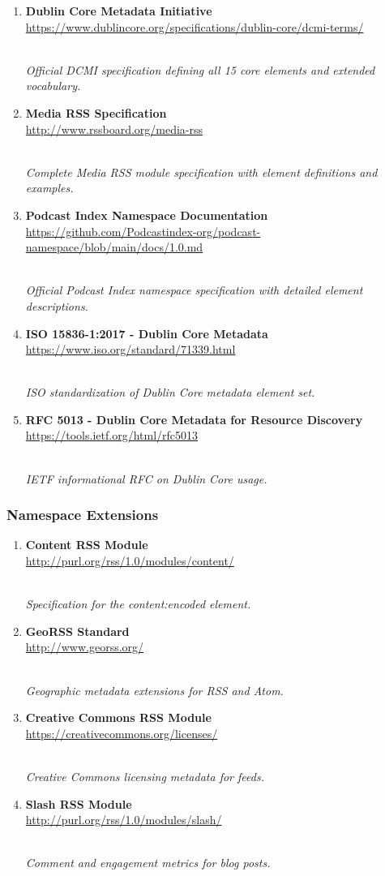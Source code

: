 \documentclass[
  letterpaper,
  DIV=11,
  numbers=noendperiod]{scrartcl}
\begin{document}
\begin{enumerate}
\def\labelenumi{\arabic{enumi}.}
\item
  \textbf{Dublin Core Metadata Initiative}\\
  \url{https://www.dublincore.org/specifications/dublin-core/dcmi-terms/}\strut \\
  \emph{Official DCMI specification defining all 15 core elements and
  extended vocabulary.}
\item
  \textbf{Media RSS Specification}\\
  \url{http://www.rssboard.org/media-rss}\strut \\
  \emph{Complete Media RSS module specification with element definitions
  and examples.}
\item
  \textbf{Podcast Index Namespace Documentation}\\
  \url{https://github.com/Podcastindex-org/podcast-namespace/blob/main/docs/1.0.md}\strut \\
  \emph{Official Podcast Index namespace specification with detailed
  element descriptions.}
\item
  \textbf{ISO 15836-1:2017 - Dublin Core Metadata}\\
  \url{https://www.iso.org/standard/71339.html}\strut \\
  \emph{ISO standardization of Dublin Core metadata element set.}
\item
  \textbf{RFC 5013 - Dublin Core Metadata for Resource Discovery}\\
  \url{https://tools.ietf.org/html/rfc5013}\strut \\
  \emph{IETF informational RFC on Dublin Core usage.}
\end{enumerate}

\subsubsection{Namespace Extensions}\label{namespace-extensions}

\begin{enumerate}
\def\labelenumi{\arabic{enumi}.}
\setcounter{enumi}{5}
\item
  \textbf{Content RSS Module}\\
  \url{http://purl.org/rss/1.0/modules/content/}\strut \\
  \emph{Specification for the content:encoded element.}
\item
  \textbf{GeoRSS Standard}\\
  \url{http://www.georss.org/}\strut \\
  \emph{Geographic metadata extensions for RSS and Atom.}
\item
  \textbf{Creative Commons RSS Module}\\
  \url{https://creativecommons.org/licenses/}\strut \\
  \emph{Creative Commons licensing metadata for feeds.}
\item
  \textbf{Slash RSS Module}\\
  \url{http://purl.org/rss/1.0/modules/slash/}\strut \\
  \emph{Comment and engagement metrics for blog posts.}
\end{enumerate}
\end{document}
